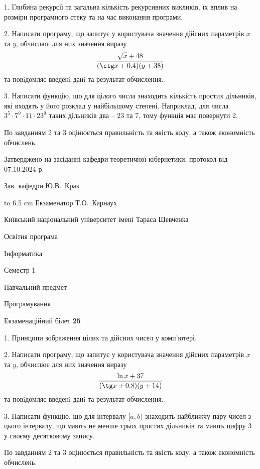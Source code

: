 \documentclass[12pt, ukrainian]{article}
\begin{document}
{%
1. Глибина рекурсії та загальна кількість рекурсивних викликів, їх вплив на розміри програмного стеку та на час виконання програми.%
\par
2. Написати програму, що запитує у користувача значення дійсних параметрів $x$ та $y$, обчислює для них значення виразу 
$$\frac{\sqrt x + 48}{(\ctg x + 0.4) (y + 38)}$$ 
та повiдомляє введенi данi та результат обчислення.

\par
3. Написати функцію, що для цілого числа знаходить кількість простих дільників, які входять у його розклад у найбільшому степені. Наприклад, для числа $3^5{\cdot}7^9{\cdot}11{\cdot}23^{9}$ таких дільників два – $23$ та $7$, тому функція має повернути $2$.

По завданням 2 та 3 оцінюється правильність та якість коду, а також економність обчислень.

}
{\smallskip\smallskip \begin {scriptsize} Затверджено на засіданні кафедри теоретичної кібернетики, протокол   від   07.10.2024 р.\par\smallskip\smallskip\smallskip\smallskip
{\parbox {6.5 cm} {Зав. кафедри \dotfill Ю.В.~Крак}}\hspace {0.7cm} {\hbox to 6.5 cm { Екзаменатор \dotfill Т.О.~Карнаух}} \end{scriptsize}}
\newpage
{{\begin {scriptsize}\par
{ \center  Київський національний університет імені Тараса Шевченка \par}
{\parbox {5 cm}{Освітня програма \hfill}{\parbox {7 cm}{Інформатика\hfill}}\parbox {6 cm}{\hfill Семестр 1}}\par
{\parbox {5 cm} {Навчальний предмет \hfill}\parbox {7 cm}{Програмування \hfill}\parbox {6cm}{\hfill}\par}\vspace{-15pt} \end{scriptsize}}{\center Екзаменаційний білет \No \textbf { 25 }\par}}
{%
1. Принципи зображення цілих та дійсних чисел у комп'ютері.%
\par
2. Написати програму, що запитує у користувача значення дійсних параметрів $x$ та $y$, обчислює для них значення виразу 
$$\frac{\ln x + 37}{(\tg x + 0.8) (y + 14)}$$ 
та повiдомляє введенi данi та результат обчислення.

\par
3. Написати функцію, що для інтервалу $[a, b)$ знаходить найближчу пару чисел з цього інтервалу, що мають не менше трьох простих дільників та мають цифру 3 у своєму десятковому запису.

По завданням 2 та 3 оцінюється правильність та якість коду, а також економність обчислень.

}
\end{document}
